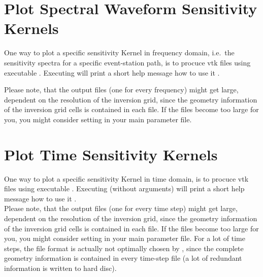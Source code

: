 \section{Plot Spectral Waveform Sensitivity Kernels} \label{basic_steps,sec:plot_kernels}
%
One way to plot a specific sensitivity Kernel in frequency domain, i.e.\ the sensitivity spectra for a specific
event-station path, is to procuce vtk files using executable . 
Executing  will print a short help message how to use it .

Please note, that the output  files (one for every frequency) might get large, dependent on the resolution 
of the inversion grid, since the geometry information of the inversion grid cells is contained in each  file.
If the files become too large for you, you might consider setting  in your 
main parameter file.
%
\section{Plot Time Sensitivity Kernels} \label{basic_steps,sec:plot_time_kernels}
%
One way to plot a specific sensitivity Kernel in time domain, is to procuce vtk files using executable . 
Executing  (without arguments) will print a short help message how to use it .\\

Please note, that the output  files (one for every time step) might get large, dependent on the resolution 
of the inversion grid, since the geometry information of the inversion grid cells is contained in each  file.
If the files become too large for you, you might consider setting  in your 
main parameter file.
For a lot of time steps, the  file format is actually not optimally chosen by \ASKI{}, since the complete geometry
information is contained in every time-step file (a lot of redundant information is written to hard disc).
%
